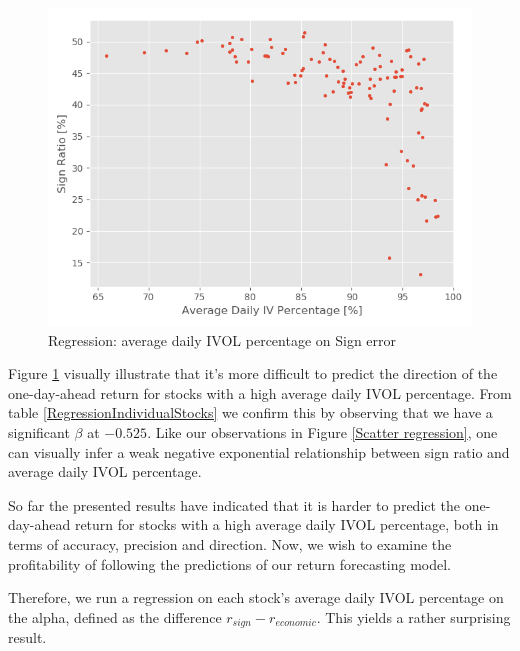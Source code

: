 \begin{figure}[h]
    \centering
    \includegraphics[scale = 0.5]{Plot/IndividualStockRegression1.png}
    \caption{Regression: average daily IVOL percentage on Sign error}
    \label{IVSignError}
\end{figure}

Figure \ref{IVSignError} visually illustrate that it's more difficult to predict the direction of the one-day-ahead return for stocks with a high average daily IVOL percentage. From table \ref{RegressionIndividualStocks} we confirm this by observing that we have a significant $\beta$ at $-0.525$. Like our observations in Figure \ref{Scatter regression}, one can visually infer a weak negative exponential relationship between sign ratio and average daily IVOL percentage.

So far the presented results have indicated that it is harder to predict the one-day-ahead return for stocks with a high average daily IVOL percentage, both in terms of accuracy, precision and direction. Now, we wish to examine the profitability of following the predictions of our return forecasting model. 

Therefore, we run a regression on each stock’s average daily IVOL percentage on the alpha, defined as the difference $r_{sign}-r_{economic}$. This yields a rather surprising result.


